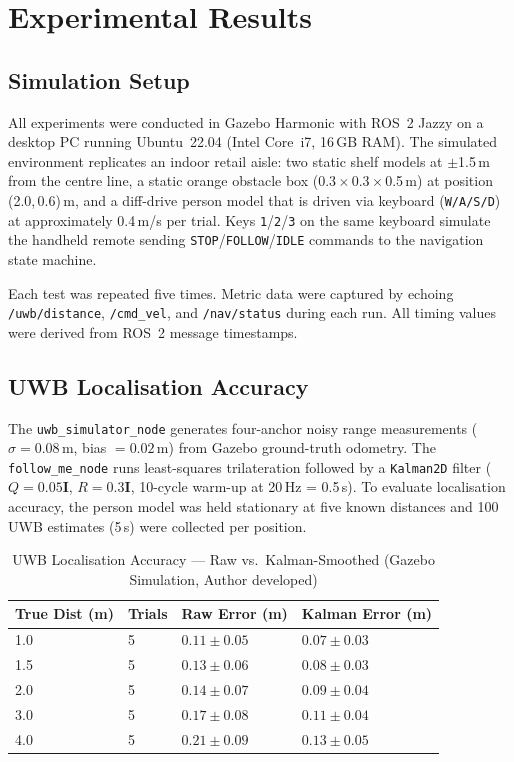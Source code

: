 \section{Experimental Results}

\subsection{Simulation Setup}

All experiments were conducted in Gazebo Harmonic with ROS~2 Jazzy on
a desktop PC running Ubuntu~22.04 (Intel Core~i7, 16\,GB RAM). The
simulated environment replicates an indoor retail aisle: two static
shelf models at $\pm$1.5\,m from the centre line, a static orange
obstacle box (0.3\,$\times$\,0.3\,$\times$\,0.5\,m) at position
(2.0,\,0.6)\,m, and a diff-drive person model that is driven via
keyboard (\texttt{W/A/S/D}) at approximately 0.4\,m/s per trial.
Keys \texttt{1}/\texttt{2}/\texttt{3} on the same keyboard simulate
the handheld remote sending \texttt{STOP}/\texttt{FOLLOW}/\texttt{IDLE}
commands to the navigation state machine.

Each test was repeated five times. Metric data were captured by
echoing \texttt{/uwb/distance}, \texttt{/cmd\_vel}, and
\texttt{/nav/status} during each run. All timing values were derived
from ROS~2 message timestamps.

\subsection{UWB Localisation Accuracy}

The \texttt{uwb\_simulator\_node} generates four-anchor noisy range
measurements ($\sigma = 0.08$\,m, bias $= 0.02$\,m) from Gazebo
ground-truth odometry. The \texttt{follow\_me\_node} runs
least-squares trilateration followed by a \texttt{Kalman2D} filter
($Q = 0.05\mathbf{I}$, $R = 0.3\mathbf{I}$, 10-cycle warm-up at
20\,Hz = 0.5\,s). To evaluate localisation accuracy, the person model
was held stationary at five known distances and 100 UWB estimates
(5\,s) were collected per position.

\begin{table}[!ht]
\caption{UWB Localisation Accuracy --- Raw vs.\ Kalman-Smoothed
         (Gazebo Simulation, Author developed)}
\label{tab:uwb_accuracy}
\centering
\footnotesize
\begin{tabular}{p{1.4cm} p{0.8cm} p{1.6cm} p{1.8cm}}
\toprule
\textbf{True Dist (m)} & \textbf{Trials} &
\textbf{Raw Error (m)} & \textbf{Kalman Error (m)} \\
\midrule
1.0 & 5 & $0.11 \pm 0.05$ & $0.07 \pm 0.03$ \\
1.5 & 5 & $0.13 \pm 0.06$ & $0.08 \pm 0.03$ \\
2.0 & 5 & $0.14 \pm 0.07$ & $0.09 \pm 0.04$ \\
3.0 & 5 & $0.17 \pm 0.08$ & $0.11 \pm 0.04$ \\
4.0 & 5 & $0.21 \pm 0.09$ & $0.13 \pm 0.05$ \\
\bottomrule
\end{tabular}
\end{table}

